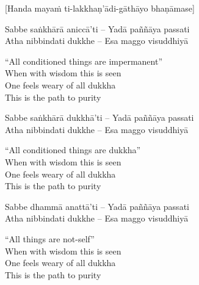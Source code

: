 \begin{center}
  [Handa mayaṁ ti-lakkhaṇ’ādi-gāthāyo bhaṇāmase]
\end{center}

\begin{twochants}
  Sabbe saṅkhārā aniccā’ti – Yadā paññāya passati\\
  Atha nibbindati dukkhe – Esa maggo visuddhiyā\\
\end{twochants}

\begin{english}
  “All conditioned things are impermanent”\\
  When with wisdom this is seen\\
  One feels weary of all dukkha\\
  This is the path to purity
\end{english}

\begin{twochants}
  Sabbe saṅkhārā dukkhā’ti – Yadā paññāya passati\\
  Atha nibbindati dukkhe – Esa maggo visuddhiyā\\
\end{twochants}

\begin{english}
  “All conditioned things are dukkha”\\
  When with wisdom this is seen\\
  One feels weary of all dukkha\\
  This is the path to purity
\end{english}

\begin{twochants}
  Sabbe dhammā anattā’ti – Yadā paññāya passati\\
  Atha nibbindati dukkhe – Esa maggo visuddhiyā\\
\end{twochants}

\begin{english}
  “All things are not-self”\\
  When with wisdom this is seen\\
  One feels weary of all dukkha\\
  This is the path to purity
\end{english}


